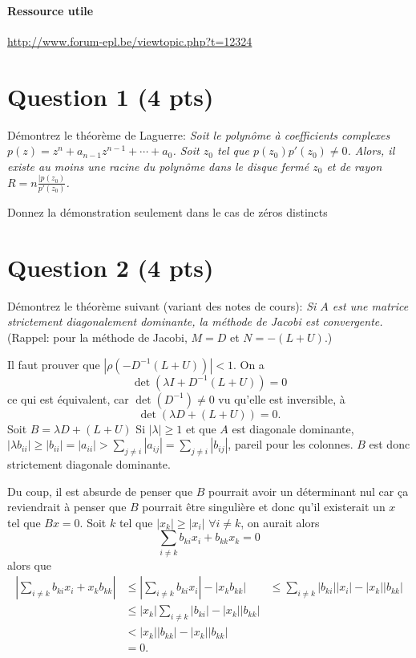 


\paragraph{Ressource utile}
\url{http://www.forum-epl.be/viewtopic.php?t=12324}

\section*{Question 1 (4 pts)}
Démontrez le théorème de Laguerre:
\textit{
  Soit le polynôme à coefficients complexes
  $p(z) = z^n + a_{n-1}z^{n-1} + \cdots + a_0$.
  Soit $z_0$ tel que $p(z_0)p'(z_0) \neq 0$.
  Alors, il existe au moins une racine du polynôme dans le disque
  fermé $z_0$ et de rayon $R = n\frac{|p(z_0)}{p'(z_0)}$.
}

Donnez la démonstration seulement dans le cas de zéros distincts

\begin{solution}
\end{solution}

\section*{Question 2 (4 pts)}
Démontrez le théorème suivant (variant des notes de cours):
\textit{
  Si $A$ est une matrice strictement diagonalement dominante,
  la méthode de Jacobi est convergente.
}
(Rappel: pour la méthode de Jacobi, $M = D$ et $N = -(L+U)$.)

\begin{solution}
  Il faut prouver que $|\rho(-D^{-1}(L+U))| < 1$.
  On a
  \[ \det(\lambda I + D^{-1}(L+U)) = 0 \]
  ce qui est équivalent, car $\det(D^{-1}) \neq 0$ vu qu'elle est inversible, à
  \[ \det(\lambda D + (L+U)) = 0. \]
  Soit $B = \lambda D + (L+U)$
  Si $|\lambda| \geq 1$ et que $A$ est diagonale dominante,
  $|\lambda b_{ii}| \geq |b_{ii}| = |a_{ii}| > \sum_{j \neq i} |a_{ij}| = \sum_{j \neq i} |b_{ij}|$,
  pareil pour les colonnes.
  $B$ est donc strictement diagonale dominante.

  Du coup, il est absurde de penser que $B$ pourrait avoir un déterminant nul car ça reviendrait
  à penser que $B$ pourrait être singulière et donc qu'il existerait un $x$ tel que
  $Bx = 0$.
  Soit $k$ tel que $|x_k| \geq |x_i|$ $\forall i \neq k$, on aurait alors
  \[ \sum_{i \neq k} b_{ki} x_i + b_{kk} x_k = 0 \]
  alors que
  \begin{align*}
    |\sum_{i \neq k} b_{ki} x_i + x_k b_{kk}| & \leq |\sum_{i \neq k} b_{ki} x_i| - |x_k b_{kk}|
    & \leq \sum_{i \neq k} |b_{ki}| |x_i| - |x_k| |b_{kk}|\\
    & \leq |x_k| \sum_{i \neq k} |b_{ki}| - |x_k| |b_{kk}|\\
    & < |x_k| |b_{kk}| - |x_k| |b_{kk}|\\
    & = 0.
  \end{align*}
\end{solution}

